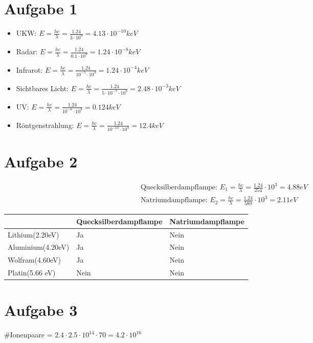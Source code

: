 \section{Aufgabe 1}
\begin{itemize}
    \item UKW: $E = \frac{h c}{\lambda} = \frac{1.24}{3 \cdot 10^{9}} = 4.13 \cdot 10^{-10} keV$
    \item Radar: $E = \frac{h c}{\lambda} = \frac{1.24}{0.1 \cdot 10^{9}} = 1.24 \cdot 10^{-8} keV$
    \item Infrarot: $E = \frac{h c}{\lambda} = \frac{1.24}{10^{-5} \cdot 10^{9}} = 1.24 \cdot 10^{-4} keV$
    \item Sichtbares Licht: $E = \frac{h c}{\lambda} = \frac{1.24}{5 \cdot 10^{-7} \cdot 10^{9}} = 2.48 \cdot 10^{-3} keV$
    \item UV: $E = \frac{h c}{\lambda} = \frac{1.24}{10^{-8} \cdot 10^{9}} = 0.124 keV$
    \item Röntgenstrahlung: $E = \frac{h c}{\lambda} = \frac{1.24}{10^{-10} \cdot 10^{9}} = 12.4 keV$

\end{itemize}

\section{Aufgabe 2}
\begin{align}
    \text{Quecksilberdampflampe: }E_1 = \frac{hc}{\lambda} = \frac{1.24}{254} \cdot 10^{3} = 4.88eV \\
    \text{Natriumdampflampe: } E_2 = \frac{hc}{\lambda} = \frac{1.24}{589} \cdot 10^{3} = 2.11eV 
\end{align}

\begin{tabularx}{0.8\textwidth} { 
  | >{\raggedright\arraybackslash}X 
  | >{\centering\arraybackslash}X 
  | >{\centering\arraybackslash}X | }
 \hline
  & Quecksilberdampflampe & Natriumdampflampe \\
 \hline
 Lithium(2.20eV)  & Ja  & Nein  \\
 \hline
 Aluminium(4.20eV)  & Ja  & Nein  \\
 \hline
 Wolfram(4.60eV)  & Ja  & Nein  \\
 \hline
 Platin(5.66 eV)  & Nein  & Nein  \\
\hline
\end{tabularx}



\section{Aufgabe 3}
\#Ionenpaare = $2.4 \cdot 2.5 \cdot 10^{14} \cdot 70 = 4.2 \cdot 10^{16}$

